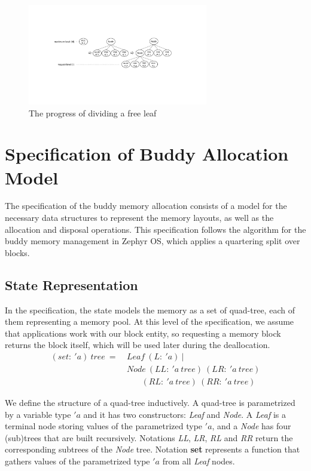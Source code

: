\begin{figure}[htbp]
	\centering
	\includegraphics[width=0.7\textwidth]{fig1.pdf}
	\caption{The progress of dividing a free leaf}
	\label{fig:splitleaf}
\end{figure}

\section{Specification of Buddy Allocation Model}\label{sec:spec}
The specification of the buddy memory allocation consists of a model for the necessary data structures to represent the memory layouts, as well as the allocation and disposal operations. This specification follows the algorithm for the buddy memory management in Zephyr OS, which applies a quartering split over blocks.

\subsection{State Representation}\label{statedes}
In the specification, the state models the memory as a set of quad-tree, each of them representing a memory pool. At this level of the specification, we assume that applications work with our block entity, so requesting a memory block returns the block itself, which will be used later during the deallocation.
\begin{align*}
(set:\ 'a)\ tree\ =\ &Leaf\ (L:\ 'a)\ | \\
&Node\ (LL:\ 'a\ tree)\ (LR:\ 'a\ tree)\\
&\ \ \ \ \ \ \ \ (RL:\ 'a\ tree)\ (RR:\ 'a\ tree)
\end{align*}

We define the structure of a quad-tree inductively. A quad-tree is parametrized by a variable type $'a$ and it has two constructors: \emph{Leaf} and \emph{Node}. A \emph{Leaf} is a terminal node storing values of the parametrized type $'a$, and a \emph{Node} has four (sub)trees that are built recursively. Notations \emph{LL}, \emph{LR}, \emph{RL} and \emph{RR} return the corresponding subtrees of the \emph{Node} tree. Notation \textbf{set} represents a function that gathers values of the parametrized type $'a$ from all \emph{Leaf} nodes.

